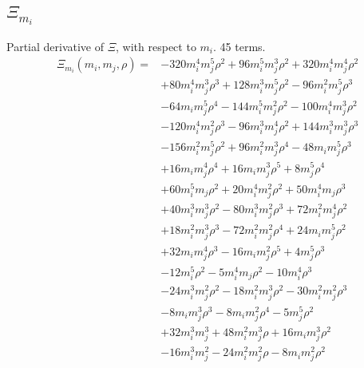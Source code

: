 \subsection*{$\Xi_{m_i}$}
Partial derivative of $\Xi$, with respect to $m_i$. 45 terms.
{\small
\begin{align*}
\Xi_{m_i}(m_i,m_j,\rho)={}&-320m_i^{4}m_j^{5}\rho^{2}+96m_i^{5}m_j^{3}\rho^{2}+320m_i^{4}m_j^{4}\rho^{2}\\
&+80m_i^{4}m_j^{3}\rho^{3}+128m_i^{3}m_j^{5}\rho^{2}-96m_i^{2}m_j^{5}\rho^{3}\\
&-64m_im_j^{5}\rho^{4}-144m_i^{5}m_j^{2}\rho^{2}-100m_i^{4}m_j^{3}\rho^{2}\\
&-120m_i^{4}m_j^{2}\rho^{3}-96m_i^{3}m_j^{4}\rho^{2}+144m_i^{3}m_j^{3}\rho^{3}\\
&-156m_i^{2}m_j^{5}\rho^{2}+96m_i^{2}m_j^{3}\rho^{4}-48m_im_j^{5}\rho^{3}\\
&+16m_im_j^{4}\rho^{4}+16m_im_j^{3}\rho^{5}+8m_j^{5}\rho^{4}\\
&+60m_i^{5}m_j\rho^{2}+20m_i^{4}m_j^{2}\rho^{2}+50m_i^{4}m_j\rho^{3}\\
&+40m_i^{3}m_j^{3}\rho^{2}-80m_i^{3}m_j^{2}\rho^{3}+72m_i^{2}m_j^{4}\rho^{2}\\
&+18m_i^{2}m_j^{3}\rho^{3}-72m_i^{2}m_j^{2}\rho^{4}+24m_im_j^{5}\rho^{2}\\
&+32m_im_j^{4}\rho^{3}-16m_im_j^{2}\rho^{5}+4m_j^{5}\rho^{3}\\
&-12m_i^{5}\rho^{2}-5m_i^{4}m_j\rho^{2}-10m_i^{4}\rho^{3}\\
&-24m_i^{3}m_j^{2}\rho^{2}-18m_i^{2}m_j^{3}\rho^{2}-30m_i^{2}m_j^{2}\rho^{3}\\
&-8m_im_j^{3}\rho^{3}-8m_im_j^{2}\rho^{4}-5m_j^{5}\rho^{2}\\
&+32m_i^{3}m_j^{3}+48m_i^{2}m_j^{3}\rho+16m_im_j^{3}\rho^{2}\\
&-16m_i^{3}m_j^{2}-24m_i^{2}m_j^{2}\rho-8m_im_j^{2}\rho^{2}
\end{align*}
}

